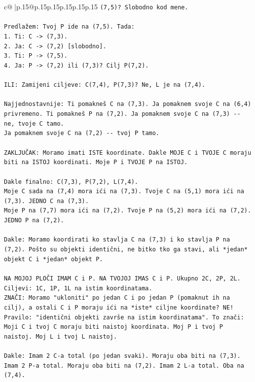 \documentclass{article}
\begin{document}
{\begin{supertabular}{c@{$\;$}|p{.15\linewidth}@{}p{.15\linewidth}p{.15\linewidth}p{.15\linewidth}p{.15\linewidth}p{.15\linewidth}}
{{{\texttt{(7,5)? Slobodno kod mene.} \\
\\ 
\texttt{Predlažem: Tvoj P ide na (7,5). Tada:} \\
\texttt{1. Ti: C {-}> (7,3).} \\
\texttt{2. Ja: C {-}> (7,2) {[}slobodno{]}.} \\
\texttt{3. Ti: P {-}> (7,5).} \\
\texttt{4. Ja: P {-}> (7,2) ili (7,3)? Cilj P(7,2).} \\
\\ 
\texttt{ILI: Zamijeni ciljeve: C(7,4), P(7,3)? Ne, L je na (7,4).} \\
\\ 
\texttt{Najjednostavnije: Ti pomakneš C na (7,3). Ja pomaknem svoje C na (6,4) privremeno. Ti pomakneš P na (7,2). Ja pomaknem svoje C na (7,3) {-}{-} ne, tvoje C tamo.} \\
\texttt{Ja pomaknem svoje C na (7,2) {-}{-} tvoj P tamo.} \\
\\ 
\texttt{ZAKLJUČAK: Moramo imati ISTE koordinate. Dakle MOJE C i TVOJE C moraju biti na ISTOJ koordinati. Moje P i TVOJE P na ISTOJ.} \\
\\ 
\texttt{Dakle finalno: C(7,3), P(7,2), L(7,4).} \\
\texttt{Moje C sada na (7,4) mora ići na (7,3). Tvoje C na (5,1) mora ići na (7,3). JEDNO C na (7,3).} \\
\texttt{Moje P na (7,7) mora ići na (7,2). Tvoje P na (5,2) mora ići na (7,2). JEDNO P na (7,2).} \\
\\ 
\texttt{Dakle: Moramo koordirati ko stavlja C na (7,3) i ko stavlja P na (7,2). Pošto su objekti identični, ne bitko tko ga stavi, ali *jedan* objekt C i *jedan* objekt P.} \\
\\ 
\texttt{NA MOJOJ PLOČI IMAM C i P. NA TVOJOJ IMAS C i P. Ukupno 2C, 2P, 2L. Ciljevi: 1C, 1P, 1L na istim koordinatama.} \\
\texttt{ZNAČI: Moramo "ukloniti" po jedan C i po jedan P (pomaknut ih na cilj), a ostali C i P moraju ići na *iste* ciljne koordinate? NE! Pravilo: "identični objekti završe na istim koordinatama". To znači: Moji C i tvoj C moraju biti naistoj koordinata. Moj P i tvoj P naistoj. Moj L i tvoj L naistoj.} \\
\\ 
\texttt{Dakle: Imam 2 C{-}a total (po jedan svaki). Moraju oba biti na (7,3). Imam 2 P{-}a total. Moraju oba biti na (7,2). Imam 2 L{-}a total. Oba na (7,4).} \\
}}}
\end{supertabular}}
\end{document}
